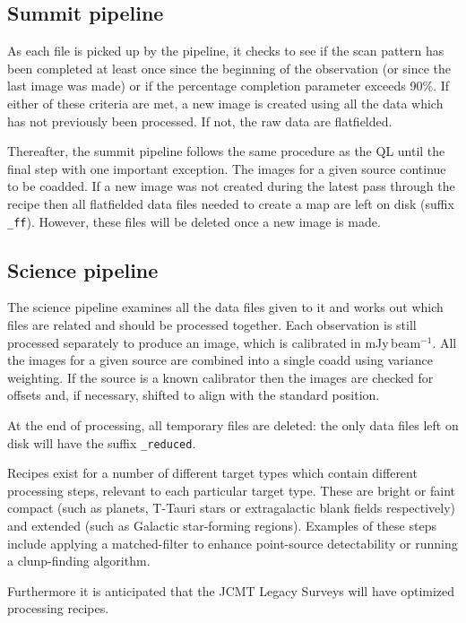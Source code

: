 \documentclass[twoside,11pt]{article}
\renewcommand{\_}{\texttt{\symbol{95}}}
\begin{document}
\subsection{Summit pipeline}

As each file is picked up by the pipeline, it checks to see if the
scan pattern has been completed at least once since the beginning of
the observation (or since the last image was made) or if the
percentage completion parameter exceeds 90\%. If either of these
criteria are met, a new image is created using all the data which has
not previously been processed. If not, the raw data are flatfielded.

Thereafter, the summit pipeline follows the same procedure as the QL
until the final step with one important exception. The images for a
given source continue to be coadded. If a new image was not created
during the latest pass through the recipe then all flatfielded data
files needed to create a map are left on disk (suffix
\verb+_ff+). However, these files will be deleted once a new image is
made.

\subsection{Science pipeline}

The science pipeline examines all the data files given to it and works
out which files are related and should be processed together. Each
observation is still processed separately to produce an image, which
is calibrated in mJy\,beam$^{-1}$. All the images for a given source
are combined into a single coadd using variance weighting. If the
source is a known calibrator then the images are checked for offsets
and, if necessary, shifted to align with the standard position.

At the end of processing, all temporary files are deleted: the only
data files left on disk will have the suffix \verb+_reduced+.

Recipes exist for a number of different target types which contain
different processing steps, relevant to each particular target
type. These are bright or faint compact (such as planets, T-Tauri
stars or extragalactic blank fields respectively) and extended (such
as Galactic star-forming regions). Examples of these steps include
applying a matched-filter to enhance point-source detectability or
running a clunp-finding algorithm.

Furthermore it is anticipated that the JCMT Legacy Surveys will have
optimized processing recipes.
\end{document}
